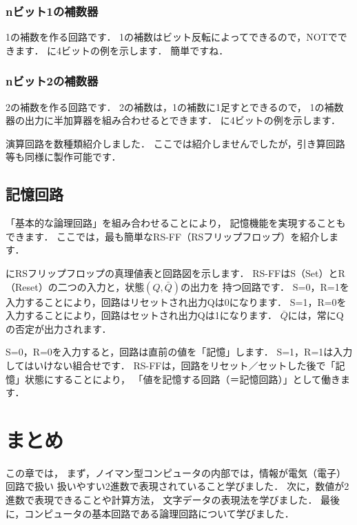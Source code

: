 \subsubsection{nビット1の補数器}
1の補数を作る回路です．
1の補数はビット反転によってできるので，NOTでできます．
に4ビットの例を示します．
簡単ですね．


\subsubsection{nビット2の補数器}
2の補数を作る回路です．
2の補数は，1の補数に1足すとできるので，
1の補数器の出力に半加算器を組み合わせるとできます．
に4ビットの例を示します．


演算回路を数種類紹介しました．
ここでは紹介しませんでしたが，引き算回路等も同様に製作可能です．

\subsection{記憶回路}
「基本的な論理回路」を組み合わせることにより，
記憶機能を実現することもできます．
ここでは，最も簡単なRS-FF（RSフリップフロップ）を紹介します．

にRSフリップフロップの真理値表と回路図を示します．
RS-FFはS（Set）とR（Reset）の二つの入力と，状態$(Q, \bar Q)$の出力を
持つ回路です．
S=0，R=1を入力することにより，回路はリセットされ出力Qは0になります．
S=1，R=0を入力することにより，回路はセットされ出力Qは1になります．
\( \bar Q \)には，常にQの否定が出力されます．

S=0，R=0を入力すると，回路は直前の値を「記憶」します．
S=1，R=1は入力してはいけない組合せです．
RS-FFは，回路をリセット／セットした後で「記憶」状態にすることにより，
「値を記憶する回路（＝記憶回路）」として働きます．


\section{まとめ}

この章では，
まず，ノイマン型コンピュータの内部では，情報が電気（電子）回路で扱い
扱いやすい2進数で表現されていること学びました．
次に，数値が2進数で表現できることや計算方法，
文字データの表現法を学びました．
最後に，コンピュータの基本回路である論理回路について学びました．


